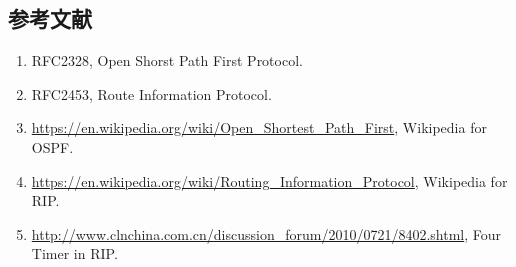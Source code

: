 \documentclass[15pt]{ctexart}
\begin{document}
\newpage
\begin{appendices}
    \section{参考文献} %
        \begin{enumerate}
        \item RFC2328, Open Shorst Path First Protocol.
        \item RFC2453, Route Information Protocol.
        \item \url{https://en.wikipedia.org/wiki/Open_Shortest_Path_First}, Wikipedia for OSPF.
        \item \url{https://en.wikipedia.org/wiki/Routing_Information_Protocol}, Wikipedia for RIP.
        \item \url{http://www.clnchina.com.cn/discussion_forum/2010/0721/8402.shtml}, Four Timer in RIP.
        \end{enumerate}
\end{appendices}
\end{document}
